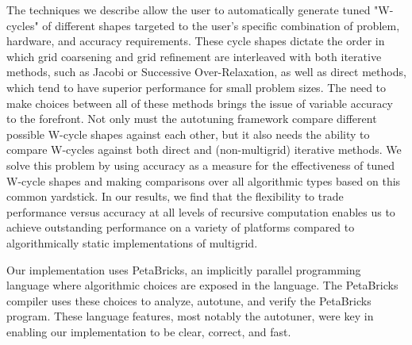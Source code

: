 \documentclass{report}
\begin{document}
The techniques we describe allow the user to automatically generate tuned
"W-cycles" of different shapes targeted to the user's specific
combination of problem, hardware, and accuracy requirements. These cycle
shapes dictate the order in which grid coarsening and grid refinement are
interleaved with both iterative methods, such as Jacobi or Successive
Over-Relaxation, as well as direct methods, which tend to have superior
performance for small problem sizes. The need to make choices between all
of these methods brings the issue of variable accuracy to the forefront.
Not only must the autotuning framework compare different possible W-cycle
shapes against each other, but it also needs the ability to compare
W-cycles against both direct and (non-multigrid) iterative methods. We
solve this problem by using accuracy as a measure for the effectiveness
of tuned W-cycle shapes and making comparisons over all algorithmic types
based on this common yardstick. In our results, we find that the
flexibility to trade performance versus accuracy at all levels of
recursive computation enables us to achieve outstanding performance on a
variety of platforms compared to algorithmically static implementations
of multigrid.

Our implementation uses PetaBricks, an implicitly parallel programming
language where algorithmic choices are exposed in the language. The
PetaBricks compiler uses these choices to analyze, autotune, and verify
the PetaBricks program. These language features, most notably the
autotuner, were key in enabling our implementation to be clear, correct,
and fast.
\end{document}
